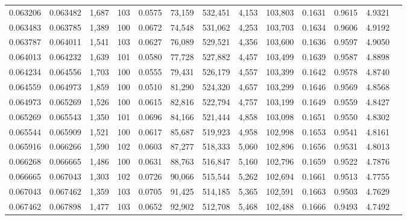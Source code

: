 \begin{tabular}{rrrrrrrrrrrrr}
0.063206 & 0.063482 & 1,687 & 103 &                                     0.0575 &  73,159 & 532,451 &   4,153 & 103,803 & 0.1631 & 0.9615 & 4.9321 \\
0.063483 & 0.063785 & 1,389 & 100 &                                     0.0672 &  74,548 & 531,062 &   4,253 & 103,703 & 0.1634 & 0.9606 & 4.9192 \\
0.063787 & 0.064011 & 1,541 & 103 &                                     0.0627 &  76,089 & 529,521 &   4,356 & 103,600 & 0.1636 & 0.9597 & 4.9050 \\
0.064013 & 0.064232 & 1,639 & 101 &                                     0.0580 &  77,728 & 527,882 &   4,457 & 103,499 & 0.1639 & 0.9587 & 4.8898 \\
0.064234 & 0.064556 & 1,703 & 100 &                                     0.0555 &  79,431 & 526,179 &   4,557 & 103,399 & 0.1642 & 0.9578 & 4.8740 \\
0.064559 & 0.064973 & 1,859 & 100 &                                     0.0510 &  81,290 & 524,320 &   4,657 & 103,299 & 0.1646 & 0.9569 & 4.8568 \\
0.064973 & 0.065269 & 1,526 & 100 &                                     0.0615 &  82,816 & 522,794 &   4,757 & 103,199 & 0.1649 & 0.9559 & 4.8427 \\
0.065269 & 0.065543 & 1,350 & 101 &                                     0.0696 &  84,166 & 521,444 &   4,858 & 103,098 & 0.1651 & 0.9550 & 4.8302 \\
0.065544 & 0.065909 & 1,521 & 100 &                                     0.0617 &  85,687 & 519,923 &   4,958 & 102,998 & 0.1653 & 0.9541 & 4.8161 \\
0.065916 & 0.066266 & 1,590 & 102 &                                     0.0603 &  87,277 & 518,333 &   5,060 & 102,896 & 0.1656 & 0.9531 & 4.8013 \\
0.066268 & 0.066665 & 1,486 & 100 &                                     0.0631 &  88,763 & 516,847 &   5,160 & 102,796 & 0.1659 & 0.9522 & 4.7876 \\
0.066665 & 0.067043 & 1,303 & 102 &                                     0.0726 &  90,066 & 515,544 &   5,262 & 102,694 & 0.1661 & 0.9513 & 4.7755 \\
0.067043 & 0.067462 & 1,359 & 103 &                                     0.0705 &  91,425 & 514,185 &   5,365 & 102,591 & 0.1663 & 0.9503 & 4.7629 \\
0.067462 & 0.067898 & 1,477 & 103 &                                     0.0652 &  92,902 & 512,708 &   5,468 & 102,488 & 0.1666 & 0.9493 & 4.7492 \\

\end{tabular}
